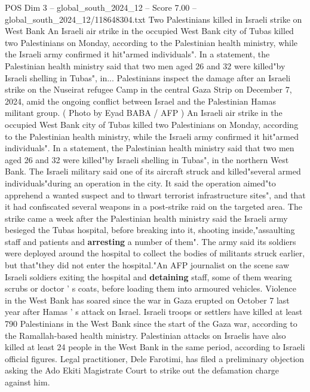 \begin{textsample}{POS Dim 3 – global\_south\_2024\_12 – Score 7.00 – global\_south\_2024\_12/118648304.txt}  \label{ex:f3_pos_393}
Two Palestinians killed in Israeli strike on West Bank An Israeli air strike in the occupied West Bank city of Tubas killed two Palestinians on Monday, according to the Palestinian health ministry, while the Israeli army confirmed it hit"armed individuals".
In a statement, the Palestinian health ministry said that two men aged 26 and 32 were killed"by Israeli shelling in Tubas", in...
Palestinians inspect the damage after an Israeli strike on the Nuseirat refugee Camp in the central Gaza Strip on December 7, 2024, amid the ongoing conflict between Israel and the Palestinian Hamas militant group. ( Photo by Eyad BABA / AFP ) An Israeli air strike in the occupied West Bank city of Tubas killed two Palestinians on Monday, according to the Palestinian health ministry, while the Israeli army confirmed it hit"armed individuals".
In a statement, the Palestinian health ministry said that two men aged 26 and 32 were killed"by Israeli shelling in Tubas", in the northern West Bank.
The Israeli military said one of its aircraft struck and killed"several armed individuals"during an operation in the city.
It said the operation aimed"to apprehend a wanted suspect and to thwart terrorist infrastructure sites", and that it had confiscated several weapons in a post-strike raid on the targeted area.
The strike came a week after the Palestinian health ministry said the Israeli army besieged the Tubas hospital, before breaking into it, shooting inside,"assaulting staff and patients and \textbf{arresting} a number of them".
The army said its soldiers were deployed around the hospital to collect the bodies of militants struck earlier, but that"they did not enter the hospital."An AFP journalist on the scene saw Israeli soldiers exiting the hospital and \textbf{detaining} staff, some of them wearing scrubs or doctor ' s coats, before loading them into armoured vehicles.
Violence in the West Bank has soared since the war in Gaza erupted on October 7 last year after Hamas ' s attack on Israel.
Israeli troops or settlers have killed at least 790 Palestinians in the West Bank since the start of the Gaza war, according to the Ramallah-based health ministry.
Palestinian attacks on Israelis have also killed at least 24 people in the West Bank in the same period, according to Israeli official figures.
Legal practitioner, Dele Farotimi, has filed a preliminary objection asking the Ado Ekiti Magistrate Court to strike out the defamation charge against him.

\end{textsample}
